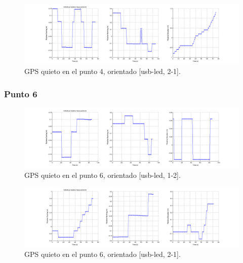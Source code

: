 \documentclass[spanish,12pt,a4paper,titlepage]{report}
\begin{document}
\begin{figure}[h!]
  \hspace{-70pt}
  \includegraphics[width=1.3\textwidth]{./img/log_07_individual.png}
  \caption{GPS quieto en el punto 4, orientado [usb-led, 2-1].}
  \label{fig:log_07_individual.png}
\end{figure}

\subsubsection*{Punto 6}
\label{sec:punto-6}

\begin{figure}[h!]
  \hspace{-70pt}
  \includegraphics[width=1.3\textwidth]{./img/log_06_individual.png}
  \caption{GPS quieto en el punto 6, orientado [usb-led, 1-2].}
  \label{fig:log_06_individual.png}
\end{figure}

\newpage

\begin{figure}[h!]
  \hspace{-70pt}
  \includegraphics[width=1.3\textwidth]{./img/log_05_individual.png}
  \caption{GPS quieto en el punto 6, orientado [usb-led, 2-1].}
  \label{fig:log_05_individual.png}
\end{figure}
\end{document}
